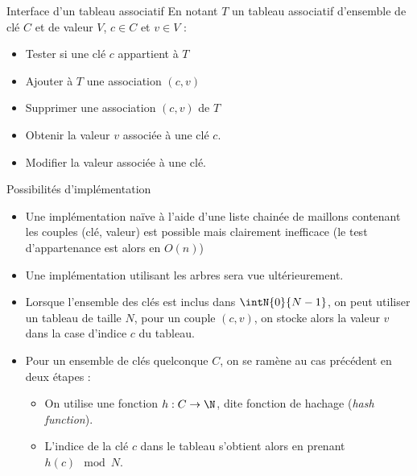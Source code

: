 \documentclass[10pt]{beamer}
\begin{document}
\begin{frame}[fragile]{\Ctitle}{\stitle}
	\begin{block}{Interface d'un tableau associatif}
		En notant $T$ un tableau associatif d'ensemble de clé $C$ et de valeur $V$,  $c \in C$ et $v \in V$ :
		\begin{itemize}
			\item<2-> Tester si une clé $c$ appartient à $T$
			\item<3-> Ajouter à $T$ une association $(c,v)$
			\item<4-> Supprimer une association $(c,v)$ de $T$
			\item<5-> Obtenir la valeur $v$ associée à une clé $c$.
			\item<6-> Modifier la valeur associée à une clé.
		\end{itemize}
	\end{block}
\end{frame}

\begin{frame}[fragile]{\Ctitle}{\stitle}
	\begin{block}{Possibilités d'implémentation}
		\begin{itemize}
			\item<1-> Une implémentation naïve à l'aide d'une liste chainée de maillons contenant les couples (clé, valeur) est possible mais clairement inefficace \onslide<2->(le test d'appartenance est alors en $O(n)$)
			\item<3-> Une implémentation utilisant les arbres sera vue ultérieurement.
			\item<4-> Lorsque l'ensemble des clés est inclus dans $\intN{0}{N-1}$, on peut utiliser un tableau de taille $N$, pour un couple $(c,v)$, on stocke alors la valeur $v$ dans la case d'indice $c$ du tableau.
			\item<5-> Pour un ensemble de clés quelconque $C$, on se ramène au cas précédent en deux étapes :
				\begin{itemize}
					\item<6-> On utilise une fonction $h : C \rightarrow \N$, dite \textcolor{BrickRed}{fonction de hachage} (\textit{hash function}).
					\item<7-> L'indice de la clé $c$ dans le tableau s'obtient alors en prenant $h(c) \mod N$.
				\end{itemize}
		\end{itemize}
	\end{block}
\end{frame}
\end{document}
